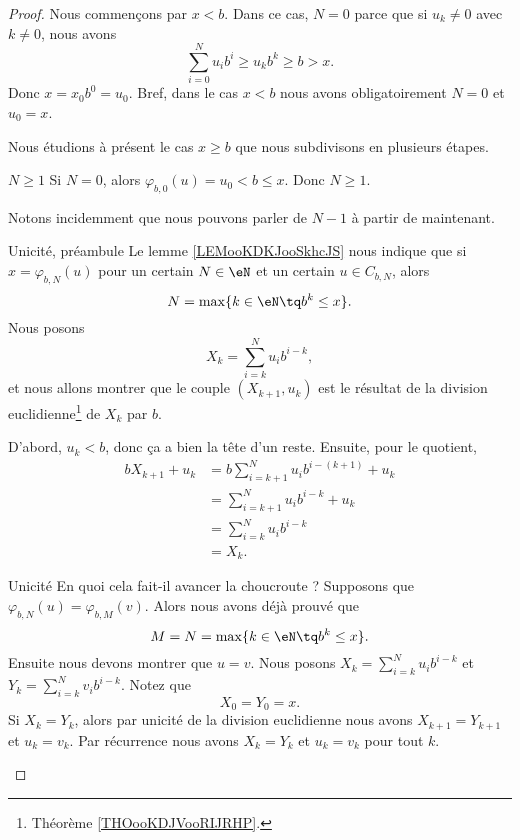 \begin{proof}
    Nous commençons par \( x<b\). Dans ce cas, \( N=0\) parce que si \( u_k\neq 0\) avec \( k\neq 0\), nous avons
    \begin{equation}
        \sum_{i=0}^Nu_ib^i\geq u_kb^k\geq b>x.
    \end{equation}
    Donc \( x=x_0b^0=u_0\). Bref, dans le cas \( x<b\) nous avons obligatoirement \( N=0\) et \( u_0=x\).

    Nous étudions à présent le cas \( x\geq b\) que nous subdivisons en plusieurs étapes.
    \begin{subproof}
    \item[\( N\geq 1\)]
    Si \( N=0\), alors \( \varphi_{b,0}(u)=u_0<b\leq x\). Donc \( N\geq 1\). 

    Notons incidemment que nous pouvons parler de \( N-1\) à partir de maintenant.
    \item[Unicité, préambule]
        Le lemme \ref{LEMooKDKJooSkhcJS} nous indique que si \( x=\varphi_{b,N}(u)\) pour un certain \( N\in \eN\) et un certain \( u\in C_{b,N}\), alors
        \begin{equation}
            N=\max\{ k\in \eN\tq b^k\leq x \}.
        \end{equation}
        Nous posons
        \begin{equation}
            X_k=\sum_{i=k}^Nu_ib^{i-k},
        \end{equation}
        et nous allons montrer que le couple \( (X_{k+1}, u_k)\) est le résultat de la division euclidienne\footnote{Théorème \ref{THOooKDJVooRIJRHP}.} de \( X_k\) par \(b\).

        D'abord, \( u_k<b\), donc ça a bien la tête d'un reste. Ensuite, pour le quotient, 
        \begin{subequations}
            \begin{align}
                bX_{k+1}+u_k&=b\sum_{i=k+1}^Nu_ib^{i-(k+1)}+u_k\\
                &=\sum_{i=k+1}^Nu_ib^{i-k}+u_k\\
                &=\sum_{i=k}^Nu_ib^{i-k}\\
                &=X_k.
            \end{align}
        \end{subequations}
    \item[Unicité]
        En quoi cela fait-il avancer la choucroute ? Supposons que \( \varphi_{b,N}(u)=\varphi_{b,M}(v)\). Alors nous avons déjà prouvé que
        \begin{equation}
            M=N=\max\{ k\in \eN\tq b^k\leq x \}.
        \end{equation}
        Ensuite nous devons montrer que \( u=v\). Nous posons \( X_k=\sum_{i=k}^Nu_ib^{i-k}\) et \( Y_k=\sum_{i=k}^Nv_ib^{i-k}\). Notez que
        \begin{equation}
            X_0=Y_0=x.
        \end{equation}
        Si \( X_k=Y_k\), alors par unicité de la division euclidienne nous avons \( X_{k+1}=Y_{k+1}\) et \( u_k=v_k\). Par récurrence nous avons \( X_k=Y_k\) et \( u_k=v_k\) pour tout \( k\).


\end{subproof}
\end{proof}
